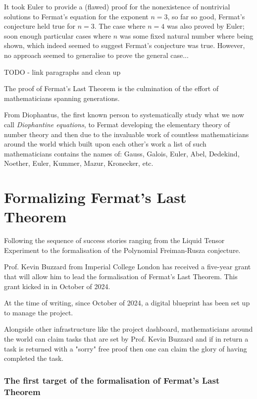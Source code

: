 It took Euler to provide a (flawed) proof for the nonexistence of nontrivial solutions to Fermat's equation for the exponent $n = 3$, so far so good, Fermat's conjecture held true for $n = 3$.
The case where $n = 4$ was also proved by Euler; soon enough particular cases where $n$ was some fixed natural number where being shown, which indeed seemed to suggest Fermat's conjecture was true.
However, no approach seemed to generalise to prove the general case...


TODO - link paragraphs and clean up

The proof of Fermat's Last Theorem is the culmination of the effort of mathematicians spanning generations.

From Diophantus, the first known person to systematically study what we now call \textit{Diophantine equations}, to Fermat developing the elementary theory of number theory and then due to the invaluable work of countless mathematicians 
around the world which built upon each other's work a list of such mathematicians contains the names of: Gauss, Galois, Euler, Abel, Dedekind, Noether, Euler, Kummer, Mazur, Kronecker, etc.



\section{Formalizing Fermat's Last Theorem}

Following the sequence of success stories ranging from the Liquid Tensor Experiment to the formalisation of the Polynomial Freiman-Rusza conjecture. 

Prof. Kevin Buzzard from Imperial College London has received a five-year grant that will allow him to lead the formalisation of Fermat's Last Theorem. This grant kicked in in October of 2024. 

At the time of writing, since October of 2024, a digital blueprint has been set up to manage the project.

Alongside other infrastructure like the project dashboard, mathematicians around the world can claim tasks that are set by Prof. Kevin Buzzard and if in return a task is returned with a "sorry" free proof then one can claim the glory of having completed the task.

\subsubsection{The first target of the formalisation of Fermat's Last Theorem}

